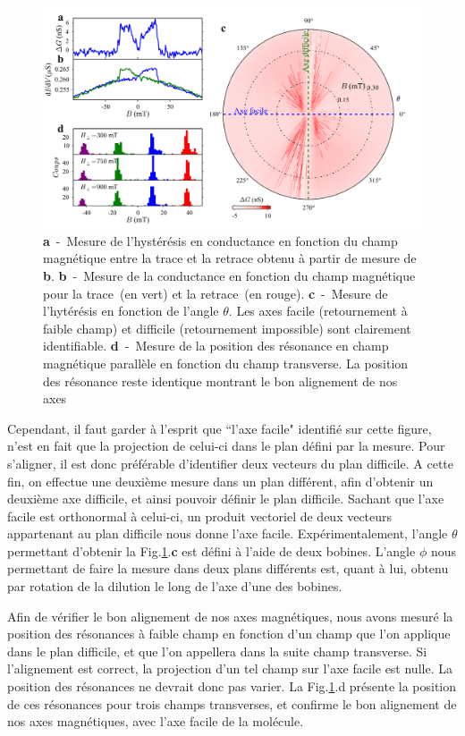 \begin{figure}
\includegraphics[scale=0.45]{Resultats/Alignement/Alignement.pdf} 
\caption{\textbf{a}~-~Mesure de l’hystérésis en conductance en fonction du champ magnétique entre la trace et la retrace obtenu à partir de mesure de \textbf{b}. \textbf{b}~-~Mesure de la conductance en fonction du champ magnétique pour la trace~(en vert) et la retrace~(en rouge). \textbf{c}~-~Mesure de l'hytérésis en fonction de l'angle $\theta$. Les axes facile (retournement à faible champ) et difficile (retournement impossible) sont clairement identifiable. \textbf{d}~-~Mesure de la position des résonance en champ magnétique parallèle en fonction du champ transverse. La position des résonance reste identique montrant le bon alignement de nos axes}
\label{alignement}
\end{figure}

Cependant, il faut garder à l'esprit que ``l'axe facile" identifié sur cette figure, n'est en fait que la projection de celui-ci dans le plan défini par la mesure. Pour s'aligner, il est donc préférable d'identifier deux vecteurs du plan difficile. A cette fin, on effectue une deuxième mesure dans un plan différent, afin d'obtenir un deuxième axe difficile, et ainsi pouvoir définir le plan difficile. Sachant que l'axe facile est orthonormal à celui-ci, un produit vectoriel de deux vecteurs appartenant au plan difficile nous donne l'axe facile. Expérimentalement, l'angle $\theta$ permettant d'obtenir la Fig.\ref{alignement}.\textbf{c} est défini à l'aide de deux bobines. L'angle $\phi$ nous permettant de faire la mesure dans deux plans différents est, quant à lui, obtenu par rotation de la dilution le long de l'axe d'une des bobines.


Afin de vérifier le bon alignement de nos axes magnétiques, nous avons mesuré la position des résonances à faible champ en fonction d'un champ que l'on applique dans le plan difficile, et que l'on appellera dans la suite champ transverse. Si l'alignement est correct, la projection d'un tel champ sur l'axe facile est nulle. La position des résonances ne devrait donc pas varier. La Fig.\ref{alignement}.d présente la position de ces résonances pour trois champs transverses, et confirme le bon alignement de nos axes magnétiques, avec l'axe facile de la molécule.

